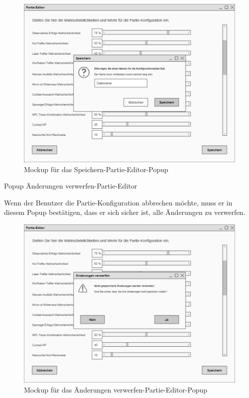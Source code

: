 \begin{figure}
  \centering
  \includegraphics[width=\textwidth]{Meilenstein03/Speichern-Partie-Editor_Mockup.png}
  \caption{Mockup für das Speichern-Partie-Editor-Popup}
\end{figure}

Popup \glqq{}Änderungen verwerfen-Partie-Editor\grqq{}

Wenn der Benutzer die Partie-Konfiguration abbrechen möchte, muss er in diesem Popup bestätigen, dass er sich sicher ist, alle Änderungen zu verwerfen.

\begin{figure}
  \centering
  \includegraphics[width=\textwidth]{Meilenstein03/AenderungenVerwerfen-Partie-Editor_Mockup.png}
  \caption{Mockup für das Änderungen verwerfen-Partie-Editor-Popup}
\end{figure}

